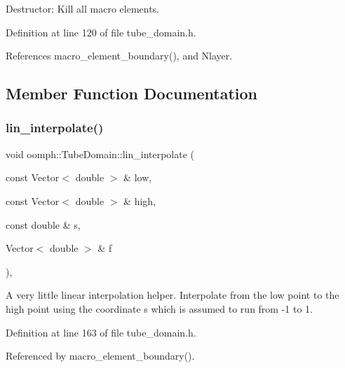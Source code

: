 Destructor\+: Kill all macro elements. 



Definition at line 120 of file tube\+\_\+domain.\+h.



References macro\+\_\+element\+\_\+boundary(), and Nlayer.



\subsection{Member Function Documentation}
\mbox{\label{classoomph_1_1TubeDomain_a4e893ffe544f30d0160c41b2aff75d7f}} 
\subsubsection{\texorpdfstring{lin\+\_\+interpolate()}{lin\_interpolate()}}
{\footnotesize\ttfamily void oomph\+::\+Tube\+Domain\+::lin\+\_\+interpolate (\begin{DoxyParamCaption}\item[{const Vector$<$ double $>$ \&}]{low,  }\item[{const Vector$<$ double $>$ \&}]{high,  }\item[{const double \&}]{s,  }\item[{Vector$<$ double $>$ \&}]{f }\end{DoxyParamCaption})\hspace{0.3cm}{\ttfamily [inline]}, {\ttfamily [private]}}



A very little linear interpolation helper. Interpolate from the low point to the high point using the coordinate s which is assumed to run from -\/1 to 1. 



Definition at line 163 of file tube\+\_\+domain.\+h.



Referenced by macro\+\_\+element\+\_\+boundary().

\mbox{\label{classoomph_1_1TubeDomain_a1f16dde7ad082e2557dff9c737dae6c0}} 
